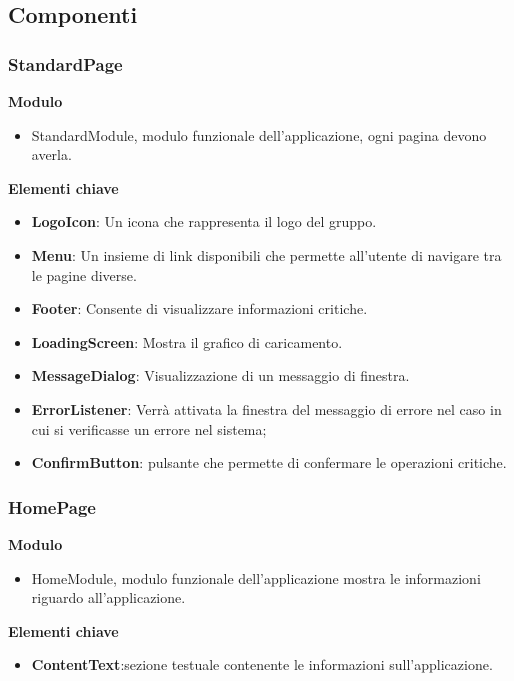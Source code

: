 \subsection{Componenti}
\label{subsec:Componenti}

\subsubsection{StandardPage}
\textbf{Modulo}
\begin{itemize}
    \item StandardModule, modulo funzionale dell'applicazione, ogni pagina devono averla.
\end{itemize}
\textbf{Elementi chiave}
\begin{itemize}
    \item \textbf{LogoIcon}: Un icona che rappresenta il logo del gruppo.
    \item \textbf{Menu}: Un insieme di link disponibili che permette all'utente di navigare tra le pagine diverse.
    \item \textbf{Footer}: Consente di visualizzare informazioni critiche.
    \item \textbf{LoadingScreen}: Mostra il grafico di caricamento.
    \item \textbf{MessageDialog}: Visualizzazione di un messaggio di finestra.
    \item \textbf{ErrorListener}: Verrà attivata la finestra del messaggio di errore nel caso in cui si verificasse un errore nel sistema;
    \item \textbf{ConfirmButton}: pulsante che permette di confermare le operazioni critiche.
\end{itemize}

\subsubsection{HomePage}
\textbf{Modulo}
\begin{itemize}
    \item HomeModule, modulo funzionale dell'applicazione mostra le informazioni riguardo all'applicazione.
\end{itemize}
\textbf{Elementi chiave}
\begin{itemize}
    \item \textbf{ContentText}:sezione testuale contenente le informazioni sull'applicazione.
\end{itemize}

